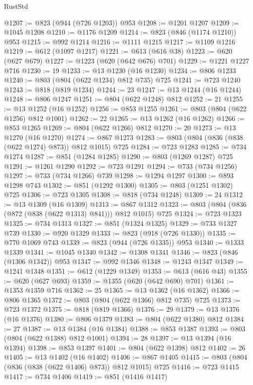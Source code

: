 \begin{lexlean}{RustStd}
\begin{coremodule}
@1207 := @823 (@944 (@726 @1203)) @953
@1208 := @1201 @1207
@1209 := @1045 @1208
@1210 := @1176 @1209
@1214 := @823 (@846 (@1174 @1210)) @953
@1215 := @992 @1214
@1216 := @1111 @1215
@1217 := @1109 @1216
@1219 := @612 (@1097 @1217)
@1221 := @613 (@616 @38)
@1223 := @620 (@627 @679)
@1227 := @1223 (@620 (@642 @676) @701)
@1229 := @1221 @1227 @716
@1230 := 19
@1233 := @13 @1230 (@16 @1230)
@1234 := @806 @1233
@1240 := @803 (@804 (@622 @1234) @812 @735) @725
@1241 := @723 @1240
@1243 := @818 (@819 @1234)
@1244 := 23
@1247 := @13 @1244 (@16 @1244)
@1248 := @806 @1247
@1251 := @804 (@622 @1248) @812
@1252 := 21
@1255 := @13 @1252 (@16 @1252)
@1256 := @853 @1255
@1261 := @803 (@804 (@622 @1256) @812 @1001)
@1262 := 22
@1265 := @13 @1262 (@16 @1262)
@1266 := @853 @1265
@1269 := @804 (@622 @1266) @812
@1270 := 20
@1273 := @13 @1270 (@16 @1270)
@1274 := @867 @1273
@1283 := @803 (@804 (@836 (@838 (@622 @1274) @873)) @812 @1015) @725
@1284 := @723 @1283
@1285 := @734 @1274
@1287 := @851 (@1284 @1285)
@1290 := @803 (@1269 @1287) @725
@1291 := @1261 @1290
@1292 := @723 @1291
@1294 := @733 (@734 @1256)
@1297 := @733 (@734 @1266) @739
@1298 := @1294 @1297
@1300 := @893 @1298 @743
@1302 := @851 (@1292 @1300)
@1305 := @803 (@1251 @1302) @725
@1306 := @723 @1305
@1308 := @818 (@734 @1248)
@1309 := 24
@1312 := @13 @1309 (@16 @1309)
@1313 := @867 @1312
@1323 := @803 (@804 (@836 (@872 (@838 (@622 @1313) @841))) @812 @1015) @725
@1324 := @723 @1323
@1325 := @734 @1313
@1327 := @851 (@1324 @1325)
@1329 := @733 @1327 @739
@1330 := @920 @1329
@1333 := @823 (@918 (@726 @1330))
@1335 := @770 @1069 @743
@1339 := @823 (@944 (@726 @1335)) @953
@1340 := @1333 @1339
@1341 := @1045 @1340
@1342 := @1308 @1341
@1346 := @823 (@846 (@1306 @1342)) @953
@1347 := @992 @1346
@1348 := @1243 @1347
@1349 := @1241 @1348
@1351 := @612 (@1229 @1349)
@1353 := @613 (@616 @43)
@1355 := @620 (@627 @693)
@1359 := @1355 (@620 (@642 @690) @701)
@1361 := @1353 @1359 @716
@1362 := 25
@1365 := @13 @1362 (@16 @1362)
@1366 := @806 @1365
@1372 := @803 (@804 (@622 @1366) @812 @735) @725
@1373 := @723 @1372
@1375 := @818 (@819 @1366)
@1376 := 29
@1379 := @13 @1376 (@16 @1376)
@1380 := @806 @1379
@1383 := @804 (@622 @1380) @812
@1384 := 27
@1387 := @13 @1384 (@16 @1384)
@1388 := @853 @1387
@1393 := @803 (@804 (@622 @1388) @812 @1001)
@1394 := 28
@1397 := @13 @1394 (@16 @1394)
@1398 := @853 @1397
@1401 := @804 (@622 @1398) @812
@1402 := 26
@1405 := @13 @1402 (@16 @1402)
@1406 := @867 @1405
@1415 := @803 (@804 (@836 (@838 (@622 @1406) @873)) @812 @1015) @725
@1416 := @723 @1415
@1417 := @734 @1406
@1419 := @851 (@1416 @1417)

\end{coremodule}
\end{lexlean}
